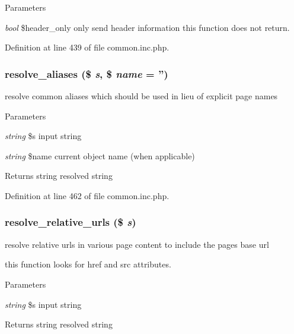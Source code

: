 \begin{DoxyParams}{Parameters}
\item[{\em bool}]\$header\_\-only only send header information this function does not return. \end{DoxyParams}


Definition at line 439 of file common.inc.php.

\hypertarget{common_8inc_8php_a78992fdfae6cd9d7d4e8053d004d1709}{
\subsubsection[{resolve\_\-aliases}]{\setlength{\rightskip}{0pt plus 5cm}resolve\_\-aliases (\$ {\em s}, \/  \$ {\em name} = {\ttfamily ''})}}
\label{common_8inc_8php_a78992fdfae6cd9d7d4e8053d004d1709}
resolve common aliases which should be used in lieu of explicit page names


\begin{DoxyParams}{Parameters}
\item[{\em string}]\$s input string \item[{\em string}]\$name current object name (when applicable) \end{DoxyParams}
\begin{DoxyReturn}{Returns}
string resolved string 
\end{DoxyReturn}


Definition at line 462 of file common.inc.php.

\hypertarget{common_8inc_8php_a81eb70073067db81ab43829870f15e6d}{
\subsubsection[{resolve\_\-relative\_\-urls}]{\setlength{\rightskip}{0pt plus 5cm}resolve\_\-relative\_\-urls (\$ {\em s})}}
\label{common_8inc_8php_a81eb70073067db81ab43829870f15e6d}
resolve relative urls in various page content to include the pages base url

this function looks for href and src attributes. 
\begin{DoxyParams}{Parameters}
\item[{\em string}]\$s input string \end{DoxyParams}
\begin{DoxyReturn}{Returns}
string resolved string 
\end{DoxyReturn}



